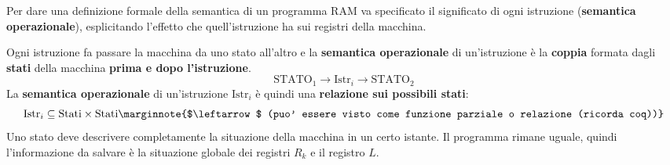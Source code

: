 Per dare una definizione formale della semantica di un programma RAM va specificato il significato di ogni istruzione (\textbf{semantica operazionale}), esplicitando l'effetto che quell'istruzione ha sui registri della macchina.

Ogni istruzione fa passare la macchina da uno stato all'altro e la \textbf{semantica operazionale} di un'istruzione è la \textbf{coppia} formata dagli \textbf{stati} della macchina \textbf{prima e dopo l'istruzione}.
$$ \text{STATO}_1 \rightarrow \boxed{\text{Istr}_i} \rightarrow \text{STATO}_2 $$
La \textbf{semantica operazionale} di un’istruzione $\text{Istr}_i$ è quindi una \textbf{relazione sui possibili stati}:
$$
\text{Istr}_i \subseteq \text{Stati} \times \text{Stati} \marginnote{$\leftarrow$ (puo' essere visto come funzione parziale o relazione (ricorda coq))}
$$
Uno stato deve descrivere completamente la situazione della macchina in un certo istante. Il programma rimane uguale, quindi l'informazione da salvare è la situazione globale dei registri $R_k$ e il registro $L$.

